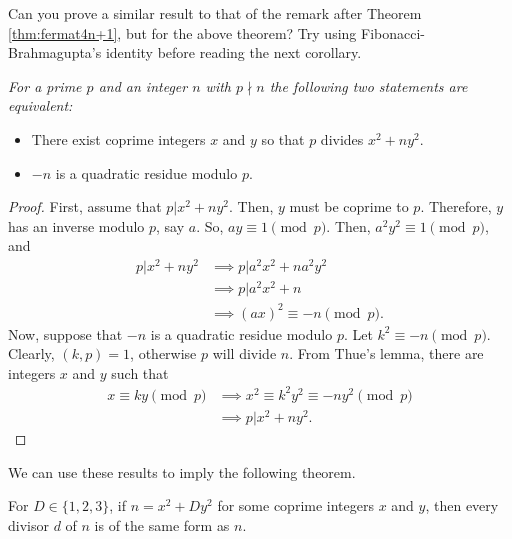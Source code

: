 \documentclass{subfile}
\begin{document}
	\begin{question}
		Can you prove a similar result to that of the remark after Theorem \autoref{thm:fermat4n+1}, but for the above theorem? Try using Fibonacci-Brahmagupta's identity before reading the next corollary.
	\end{question}
	
	\begin{corollary}\label{cor:p|x^2+ny^2}\slshape
		For a prime $p$ and an integer $n$ with $p \nmid n$ the following two statements are equivalent:
		\begin{itemize}
			\item There exist coprime integers $x$ and $y$ so that $p$ divides $x^2+ny^2$.
			\item $-n$ is a quadratic residue modulo $p$.
		\end{itemize}
	\end{corollary}
	
	\begin{proof}
		First, assume that $p|x^2+ny^2$. Then, $y$ must be coprime to $p$. Therefore, $y$ has an inverse modulo $p$, say $a$. So, $ay\equiv1\pmod p$. Then, $a^2y^2  \equiv1\pmod p$, and
		\begin{align*}
			p | x^2 + ny^2 &\implies p |a^2x^2+na^2y^2\\
			& \implies p |a^2x^2+n\\
			& \implies (ax)^2 \equiv-n\pmod p.
		\end{align*}
		Now, suppose that $-n$ is a quadratic residue modulo $p$. Let $k^2\equiv-n\pmod p$. Clearly, $(k,p)=1$, otherwise $p$ will divide $n$. From Thue's lemma, there are integers $x$ and $y$ such that 
		\begin{align*}
			x \equiv ky\pmod p & \implies x^2 \equiv k^2y^2 \equiv-ny^2\pmod p\\
			&\implies  p |x^2+ny^2.
		\end{align*}
	\end{proof}
	We can use these results to imply the following theorem.
	\begin{theorem}
		For $D\in\{1,2,3\}$, if $n=x^2+Dy^2$ for some coprime integers $x$ and $y$, then every divisor $d$ of $n$ is of the same form as $n$.
	\end{theorem}
	
\end{document}
